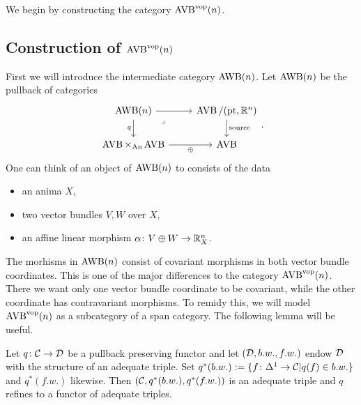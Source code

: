 We begin by constructing the category $\operatorname{AVB}^{\mathrm{vop}}(n)$.

\subsection{Construction of $\operatorname{AVB}^{\mathrm{vop}}(n)$}

\begin{construction}
    First we will introduce the intermediate category $\operatorname{AWB}(n)$.
    Let $\operatorname{AWB}(n)$ be the pullback of categories 
    \[\begin{tikzcd}
        {\AWB(n)} & {\AVB/(\pt,\R^n)} \\
        {\AVB \times_{\An} \AVB} & \AVB
        \arrow["\oplus"', from=2-1, to=2-2]
        \arrow["{\mathrm{source}}", from=1-2, to=2-2]
        \arrow["q"', from=1-1, to=2-1]
        \arrow[from=1-1, to=1-2]
        \arrow["\lrcorner"{anchor=center, pos=0.125}, draw=none, from=1-1, to=2-2]
    \end{tikzcd}.\]
    One can think of an object of $\operatorname{AWB}(n)$ to consists of the data 
    \begin{itemize}
        \item an anima $X$,
        \item two vector bundles $V,W$ over $X$,
        \item an affine linear morphism $\alpha \colon V\oplus W \to \mathbb{R}^n_X$.
    \end{itemize}
\end{construction}
The morhisms in $\operatorname{AWB}(n)$ consist of covariant morphisms in both vector bundle
coordinates. This is one of the major differences to the category $\operatorname{AVB}^{\mathrm{vop}}(n)$.
There we want only one vector bundle coordinate to be covariant, while the other coordinate 
has contravariant morphisms. To remidy this, we will model $\operatorname{AVB}^{\mathrm{vop}}(n)$ as a subcategory of 
a span category. The following lemma will be useful. 
\begin{lemma}
Let $q \colon \mathcal{C} \to \mathcal{D}$ be a pullback preserving functor and let 
$(\mathcal{D}, b.w., f.w.)$ endow $\mathcal{D}$ with the structure of an adequate triple. 
Set $q^*(b.w.) := \{ f \colon \Delta^1 \to \mathcal{C} | q(f) \in b.w.\}$
and $q^*(f.w.)$ likewise.
Then $(\mathcal{C}, q^*(b.w.), q^*(f.w.))$ is an adequate triple and $q$ refines 
to a functor of adequate triples. 
\end{lemma}

